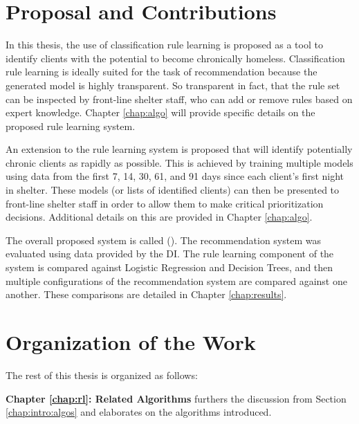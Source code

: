 

\section{Proposal and Contributions}\label{chap:intro:contrib}

In this thesis, the use of classification rule learning is proposed as a tool to identify clients with the potential to become chronically homeless.
Classification rule learning is ideally suited for the task of recommendation because the generated model is highly transparent. So transparent in fact, that the rule set can be inspected by front-line shelter staff, who can add or remove rules based on expert knowledge. Chapter \ref{chap:algo} will provide specific details on the proposed rule learning system.

An extension to the rule learning system is proposed that will identify potentially chronic clients as rapidly as possible. This is achieved by training multiple models using data from the first 7, 14, 30, 61, and 91 days since each client's first night in shelter. These models (or lists of identified clients) can then be presented to front-line shelter staff in order to allow them to make critical prioritization decisions. Additional details on this are provided in Chapter \ref{chap:algo}.

The overall proposed system is called \Name (\Abb). The \Abb recommendation system was evaluated using data provided by the DI. The rule learning component of the system is compared against Logistic Regression and Decision Trees, and then multiple configurations of the \Abb recommendation system are compared against one another. These comparisons are detailed in Chapter \ref{chap:results}.


\section{Organization of the Work}\label{chap:intro:org}


The rest of this thesis is organized as follows:

\textbf{Chapter \ref{chap:rl}: Related Algorithms} furthers the discussion from Section \ref{chap:intro:algos} and elaborates on the algorithms introduced.

